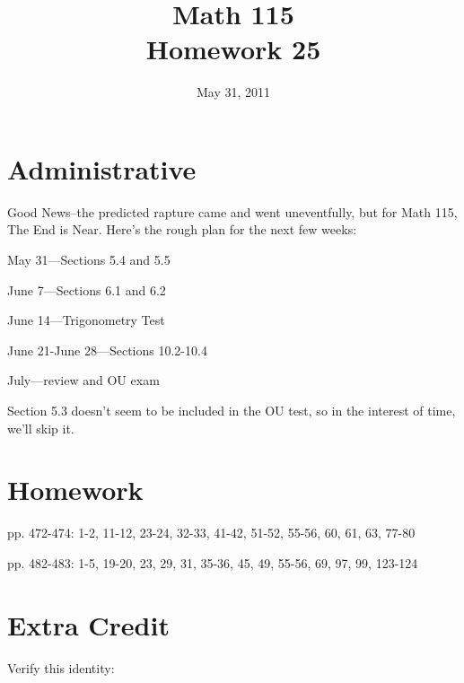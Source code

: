 \documentclass[fleqn,addpoints]{exam}
\title{Math 115 \\ Homework 25}
\date{May 31, 2011}
\begin{document}
\maketitle



\ifprintanswers
\else

\section{Administrative}

Good News--the predicted rapture came and went uneventfully, but for Math 115, The End is Near.  Here's the rough plan
for the next few weeks:

\begin{itemize*}
  \item May 31---Sections 5.4 and 5.5
  \item June 7---Sections 6.1 and 6.2
  \item June 14---Trigonometry Test
  \item June 21-June 28---Sections 10.2-10.4
  \item July---review and OU exam
\end{itemize*}

Section 5.3 doesn't seem to be included in the OU test, so in the interest of time, we'll skip it.  

\fi

\section{Homework}
\begin{itemize*}
  \item pp. 472-474: 1-2, 11-12, 23-24, 32-33, 41-42, 51-52, 55-56, 60, 61, 63, 77-80
  \item pp. 482-483: 1-5, 19-20, 23, 29, 31, 35-36, 45, 49, 55-56, 69, 97, 99, 123-124
\end{itemize*}

\section{Extra Credit}
Verify this identity:
\end{document}
